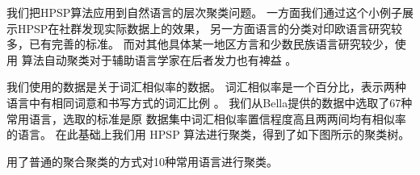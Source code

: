 \documentclass{ctexart}
\begin{document}
我们把HPSP算法应用到自然语言的层次聚类问题。
一方面我们通过这个小例子展示HPSP在社群发现实际数据上的效果，
另一方面语言的分类对印欧语言研究较多，已有完善的标准。 
而对其他具体某一地区方言和少数民族语言研究较少，使用
算法自动聚类对于辅助语言学家在后者发力也有裨益 \cite{nasution2019visualizing}。

我们使用的数据是关于词汇相似率的数据。
词汇相似率是一个百分比，表示两种语言中有相同词意和书写方式的词汇比例
\cite{bella2021database}。
我们从Bella提供的数据中选取了67种常用语言，选取的标准是原
数据集中词汇相似率置信程度高且两两间均有相似率的语言。
在此基础上我们用 HPSP 算法进行聚类，得到了如下图所示的聚类树。



\cite{al2017characterization} 用了普通的聚合聚类的方式对10种常用语言进行聚类。




\end{document}
